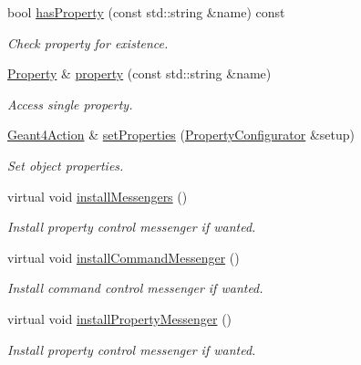 \begin{DoxyCompactItemize}
bool \hyperlink{class_d_d4hep_1_1_simulation_1_1_geant4_action_a31164c4232326b2a3c98d6c00b592427}{hasProperty} (const std::string \&name) const 
\begin{DoxyCompactList}\small\item\em Check property for existence. \item\end{DoxyCompactList}\item 
\hyperlink{class_d_d4hep_1_1_property}{Property} \& \hyperlink{class_d_d4hep_1_1_simulation_1_1_geant4_action_aa9797c4749e92c0611ca7ce6f8b7bc78}{property} (const std::string \&name)
\begin{DoxyCompactList}\small\item\em Access single property. \item\end{DoxyCompactList}\item 
\hyperlink{class_d_d4hep_1_1_simulation_1_1_geant4_action}{Geant4Action} \& \hyperlink{class_d_d4hep_1_1_simulation_1_1_geant4_action_af7cca1826781c1367ecc79c4225e09da}{setProperties} (\hyperlink{class_d_d4hep_1_1_property_configurator}{PropertyConfigurator} \&setup)
\begin{DoxyCompactList}\small\item\em Set object properties. \item\end{DoxyCompactList}\item 
virtual void \hyperlink{class_d_d4hep_1_1_simulation_1_1_geant4_action_a82c72e9476d6a5541252edbb93fe69c6}{installMessengers} ()
\begin{DoxyCompactList}\small\item\em Install property control messenger if wanted. \item\end{DoxyCompactList}\item 
virtual void \hyperlink{class_d_d4hep_1_1_simulation_1_1_geant4_action_aaaa0718b7d4f52e4c31e982b91c0eeda}{installCommandMessenger} ()
\begin{DoxyCompactList}\small\item\em Install command control messenger if wanted. \item\end{DoxyCompactList}\item 
virtual void \hyperlink{class_d_d4hep_1_1_simulation_1_1_geant4_action_a04fb6b6b16ed0aad5f552e04d99d278f}{installPropertyMessenger} ()
\begin{DoxyCompactList}\small\item\em Install property control messenger if wanted. \item\end{DoxyCompactList}\item 

\end{DoxyCompactItemize}
